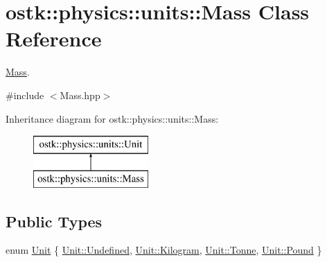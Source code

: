 \hypertarget{classostk_1_1physics_1_1units_1_1_mass}{}\section{ostk\+:\+:physics\+:\+:units\+:\+:Mass Class Reference}
\label{classostk_1_1physics_1_1units_1_1_mass}


\hyperlink{classostk_1_1physics_1_1units_1_1_mass}{Mass}.  




{\ttfamily \#include $<$Mass.\+hpp$>$}

Inheritance diagram for ostk\+:\+:physics\+:\+:units\+:\+:Mass\+:\begin{figure}[H]
\begin{center}
\leavevmode
\includegraphics[height=2.000000cm]{classostk_1_1physics_1_1units_1_1_mass}
\end{center}
\end{figure}
\subsection*{Public Types}
\begin{DoxyCompactItemize}
\item 
enum \hyperlink{classostk_1_1physics_1_1units_1_1_mass_aa8994892478fdbe6dc78d4bca08db0fa}{Unit} \{ \hyperlink{classostk_1_1physics_1_1units_1_1_mass_aa8994892478fdbe6dc78d4bca08db0faaec0fc0100c4fc1ce4eea230c3dc10360}{Unit\+::\+Undefined}, 
\hyperlink{classostk_1_1physics_1_1units_1_1_mass_aa8994892478fdbe6dc78d4bca08db0faa9d71f8d145c74f11bf9b02047645bcf4}{Unit\+::\+Kilogram}, 
\hyperlink{classostk_1_1physics_1_1units_1_1_mass_aa8994892478fdbe6dc78d4bca08db0faa8cc4e66809c94072df6426c278d7b36b}{Unit\+::\+Tonne}, 
\hyperlink{classostk_1_1physics_1_1units_1_1_mass_aa8994892478fdbe6dc78d4bca08db0faa5a9dc6d94a5d29cbb1b5bc104fa23730}{Unit\+::\+Pound}
 \}
\end{DoxyCompactItemize}
